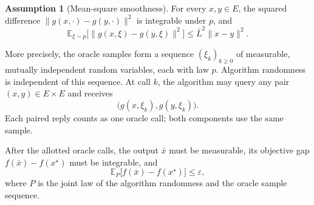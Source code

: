 \documentclass[10pt]{article}
\theoremstyle{definition}
\newtheorem{assumption}{Assumption}
\begin{document}
\begin{assumption}[Mean-square smoothness]
For every $x,y\in E$, the squared difference $\|g(x,\cdot)-g(y,\cdot)\|^2$ is integrable under $p$, and
\[
\mathbb{E}_{\xi\sim p}\bigl[\|g(x,\xi)-g(y,\xi)\|^2\bigr]
\leq\bar{L}^2\|x-y\|^2.
\]
\end{assumption}

More precisely, the oracle samples form a sequence $(\xi_k)_{k\geq0}$ of measurable, mutually independent random variables, each with law $p$. Algorithm randomness is independent of this sequence. At call $k$, the algorithm may query any pair $(x,y)\in E\times E$ and receives
\[
\bigl(g(x,\xi_k),g(y,\xi_k)\bigr).
\]
Each paired reply counts as one oracle call; both components use the same sample.

After the allotted oracle calls, the output $\bar{x}$ must be measurable, its objective gap $f(\bar{x})-f(x^\star)$ must be integrable, and
\[
\mathbb{E}_{P}\bigl[f(\bar{x})-f(x^\star)\bigr]\leq\varepsilon,
\]
where $P$ is the joint law of the algorithm randomness and the oracle sample sequence.
\end{document}
